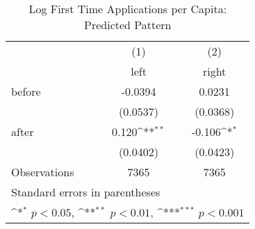 \begin{table}[htbp]\centering
\def\sym#1{\ifmmode^{#1}\else\(^{#1}\)\fi}
\caption{Log First Time Applications per Capita: Predicted Pattern}
\begin{tabular}{l*{2}{c}}
\hline\hline
                    &\multicolumn{1}{c}{(1)}&\multicolumn{1}{c}{(2)}\\
                    &\multicolumn{1}{c}{left}&\multicolumn{1}{c}{right}\\
\hline
before              &     -0.0394         &      0.0231         \\
                    &    (0.0537)         &    (0.0368)         \\
[1em]
after               &       0.120\sym{**} &      -0.106\sym{*}  \\
                    &    (0.0402)         &    (0.0423)         \\
\hline
Observations        &        7365         &        7365         \\
\hline\hline
\multicolumn{3}{l}{\footnotesize Standard errors in parentheses}\\
\multicolumn{3}{l}{\footnotesize \sym{*} \(p<0.05\), \sym{**} \(p<0.01\), \sym{***} \(p<0.001\)}\\
\end{tabular}
\end{table}
